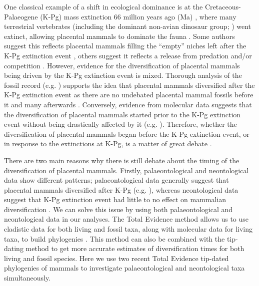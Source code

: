 \documentclass[12pt,letterpaper]{article}
\begin{document}
One classical example of a shift in ecological dominance is at the Cretaceous-Palaeogene (K-Pg) mass extinction 66 million years ago (Ma) \cite{rennetime2013}, where many terrestrial vertebrates (including the dominant non-avian dinosaur group; \cite{archibald2011extinction,rennetime2013,Brusatte2015}) went extinct, allowing placental mammals to dominate the fauna \cite{archibald2011extinction,Lovergrove}. 
Some authors suggest this reflects placental mammals filling the ``empty'' niches left after the K-Pg extinction event \cite{archibald2011extinction,OLeary08022013}, others suggest it reflects a release from predation and/or competition \cite{Slater2012MEE,Lovergrove}.
However, evidence for the diversification of placental mammals being driven by the K-Pg extinction event is mixed.
Thorough analysis of the fossil record (e.g. \cite{goswamia2011,OLeary08022013}) supports the idea that placental mammals diversified after the K-Pg extinction event as there are no undebated placental mammal fossils before it and many afterwards \cite{archibald2011extinction,goswamia2011,Slater2012MEE,OLeary08022013,Wilson2013,Brusatte2015}. 
Conversely, evidence from molecular data suggests that the diversification of placental mammals started prior to the K-Pg extinction event without being drastically affected by it (e.g. \cite{bininda2007delayed,meredithimpacts2011,Stadler12042011}).
Therefore, whether the diversification of placental mammals began before the K-Pg extinction event, or in response to the extinctions at K-Pg, is a matter of great debate \cite{dosReis2012,OLeary08022013,Springer09082013,OLeary09082013,dosReis2014}. 

There are two main reasons why there is still debate about the timing of the diversification of placental mammals. 
Firstly, palaeontological and neontological data show different patterns; palaeontological data generally suggest that placental mammals diversified after K-Pg (e.g. \cite{OLeary08022013}), whereas neontological data suggest that K-Pg extinction event had little to no effect on mammalian diversification \cite{bininda2007delayed,meredithimpacts2011,Stadler12042011}.
We can solve this issue by using both palaeontological and neontological data in our analyses. 
The Total Evidence method allows us to use cladistic data for both living and fossil taxa, along with molecular data for living taxa, to build phylogenies \cite{ronquista2012}.
This method can also be combined with the tip-dating method \cite{ronquista2012} to get more accurate estimates of diversification times for both living and fossil species.
Here we use two recent Total Evidence tip-dated phylogenies of mammals \cite{Slater2012MEE,beckancient2014} to investigate palaeontological and neontological taxa simultaneously.
\end{document}
